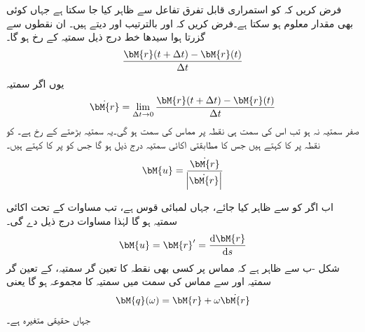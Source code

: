 فرض کریں کہ  کو استمراری قابل تفرق تفاعل  سے ظاہر کیا جا سکتا ہے جہاں  کوئی بھی مقدار معلوم ہو سکتا ہے۔فرض کریں کہ  اور  بالترتیب   اور  دیتے ہیں۔ ان نقطوں سے گزرتا ہوا سیدھا خط  درج ذیل سمتیہ کے رخ ہو گا۔
\begin{align*}
\frac{\bM{r}(t+\Delta t)-\bM{r}(t)}{\Delta t}
\end{align*} 
یوں اگر سمتیہ
\begin{align}
\dot{\bM{r}}=\lim_{\Delta t\to 0} \frac{\bM{r}(t+\Delta t)-\bM{r}(t)}{\Delta t}
\end{align}
صفر سمتیہ نہ ہو تب اس کی سمت ہی نقطہ  پر مماس کی سمت ہو گی۔یہ سمتیہ بڑھتے  کے رخ ہے۔ کو نقطہ  پر  کا  کہتے ہیں جس کا مطابقتی اکائی سمتیہ درج ذیل ہو گا جس کو  پر  کا  کہتے ہیں۔
\begin{align}\label{مساوات_الاحصاء_اکائی_مماس_الف}
\bM{u}=\frac{\dot{\bM{r}}}{\abs{\dot{\bM{r}}}}
\end{align}

اب اگر  کو  سے ظاہر کیا جائے، جہاں  لمبائی قوس ہے، تب مساوات  کے تحت
  اکائی سمتیہ ہو گا لہٰذا مساوات  درج ذیل دے گی۔
\begin{align}\label{مساوات_الاحصاء_اکائی_مماس_ب}
\bM{u}=\bM{r}'=\frac{\dif \bM{r}}{\dif s}
\end{align}
شکل -ب سے ظاہر ہے کہ مماس پر کسی بھی نقطہ  کا تعین گر سمتیہ،   کے تعین گر سمتیہ اور  سے مماس کی سمت میں سمتیہ کا مجموعہ ہو گا یعنی
\begin{align}
\bM{q}(\omega)=\bM{r}+\omega \dot{\bM{r}}
\end{align}  
جہاں  حقیقی متغیرہ ہے۔

